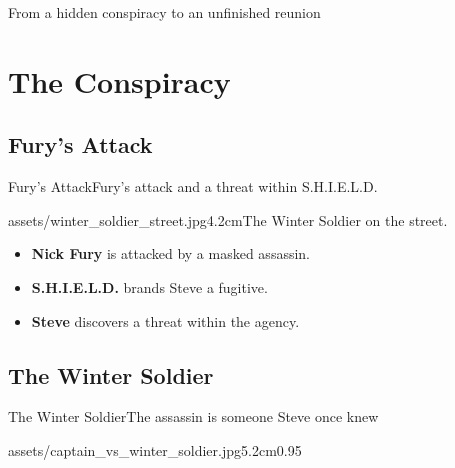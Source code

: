 \newcommand{\lossestitle}{Fury's Attack}
\newcommand{\sakaartitle}{The Winter Soldier}
\newcommand{\decisionstitle}{The Choice to Resist}
\newcommand{\prioritiestitle}{A Promise to Bucky}
\newcommand{\returntitle}{The Fall of S.H.I.E.L.D.}
\newcommand{\modeltitle}{A Tally of Those Protected}

{
    \begin{frame}
        \titlepage
    \end{frame}
}

\begin{frame}{\contentslabel}{From a hidden conspiracy to an unfinished reunion}
    \begin{SlideContents}
    \end{SlideContents}
\end{frame}

\section{The Conspiracy}
\subsection{\lossestitle}
\begin{frame}{\lossestitle}{Fury's attack and a threat within S.H.I.E.L.D.}
    \begin{SlideBulletsPhoto}{assets/winter_soldier_street.jpg}{4.2cm}{The Winter Soldier on the street.}
        \begin{itemize}
            \item \textbf{Nick Fury} is attacked by a masked assassin.
            \item \textbf{S.H.I.E.L.D.} brands Steve a fugitive.
            \item \textbf{Steve} discovers a threat within the agency.
        \end{itemize}
    \end{SlideBulletsPhoto}
\end{frame}

\subsection{\sakaartitle}
\begin{frame}{\sakaartitle}{The assassin is someone Steve once knew}
    \begin{SlideTitlePhoto}{assets/captain_vs_winter_soldier.jpg}{5.2cm}{0.95\linewidth}
        \caption{Captain America faces the Winter Soldier.}
    \end{SlideTitlePhoto}
\end{frame}

